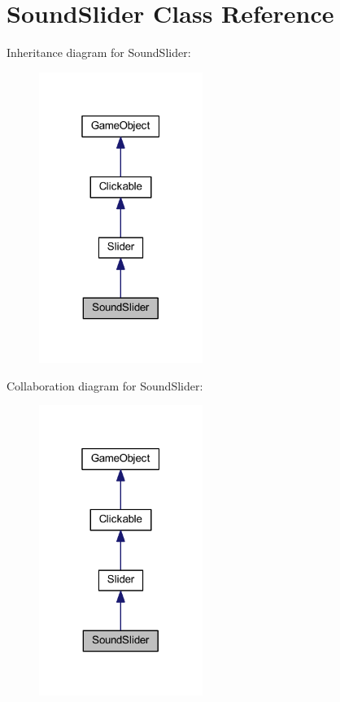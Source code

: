 \hypertarget{class_sound_slider}{\section{Sound\+Slider Class Reference}
\label{class_sound_slider}
}


Inheritance diagram for Sound\+Slider\+:\nopagebreak
\begin{figure}[H]
\begin{center}
\leavevmode
\includegraphics[width=151pt]{class_sound_slider__inherit__graph}
\end{center}
\end{figure}


Collaboration diagram for Sound\+Slider\+:\nopagebreak
\begin{figure}[H]
\begin{center}
\leavevmode
\includegraphics[width=151pt]{class_sound_slider__coll__graph}
\end{center}
\end{figure}

